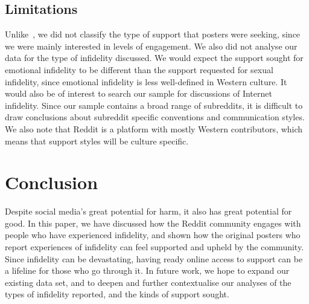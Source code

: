 


\subsection{Limitations}
Unlike~\cite{Sharma2018support}, we did not classify the type of support that posters were seeking, since we were mainly interested in levels of engagement. We also did not analyse our data for the type of infidelity discussed. We would expect the support sought for emotional infidelity to be different than the support requested for sexual infidelity, since emotional infidelity is less well-defined in Western culture. It would also be of interest to search our sample for discussions of Internet infidelity. Since our sample contains a broad range of subreddits, it is difficult to draw conclusions about subreddit specific conventions and communication styles. We also note that Reddit is a platform with mostly Western contributors, which means that support styles will be culture specific. 

\section{Conclusion}

Despite social media's great potential for harm, it also has great potential for good. In this paper, we have discussed how the Reddit community engages with people who have experienced infidelity, and shown how the original posters who report experiences of infidelity can feel supported and upheld by the community. Since infidelity can be devastating, having ready online access to support can be a lifeline for those who go through it. In future work, we hope to expand our existing data set, and to deepen and further contextualise our analyses of the types of infidelity reported, and the kinds of support sought. 








   